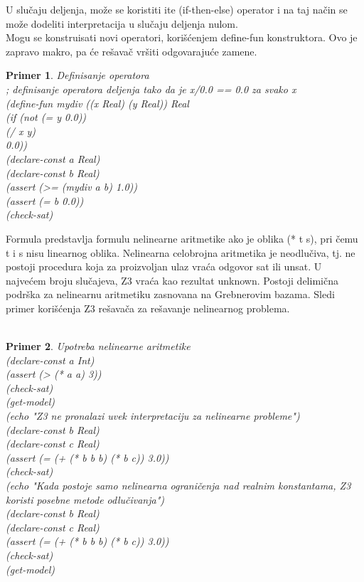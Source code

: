 \documentclass[12pt,oneside]{memoir}
\newtheorem{primer}{Primer}
\begin{document}
U slučaju deljenja, može se koristiti ite (if-then-else) operator i na taj način se može dodeliti interpretacija u slučaju deljenja nulom.
\\
Mogu se konstruisati novi operatori, korišćenjem define-fun konstruktora. Ovo je zapravo makro, pa će rešavač vršiti odgovarajuće zamene.
\begin{primer} Definisanje operatora
\\; definisanje operatora deljenja tako da je  x/0.0 == 0.0 za svako x
\\(define-fun mydiv ((x Real) (y Real)) Real
\\  (if (not (= y 0.0))
\\      (/ x y)
\\      0.0))
\\(declare-const a Real)
\\(declare-const b Real)
\\(assert (>= (mydiv a b) 1.0))
\\(assert (= b 0.0))
\\(check-sat)
\end{primer}
Formula predstavlja formulu nelinearne aritmetike ako je oblika (* t s), pri čemu t i s nisu linearnog oblika.
Nelinearna celobrojna aritmetika je neodlučiva, tj. ne postoji procedura koja za proizvoljan ulaz vraća odgovor sat ili unsat. U najvećem broju slučajeva, Z3 vraća kao rezultat unknown. 
Postoji delimična podrška za nelinearnu aritmetiku zasnovana na Grebnerovim bazama.
Sledi primer korišćenja Z3 rešavača za rešavanje nelinearnog problema.
\\ 
\\
\begin{primer} Upotreba nelinearne aritmetike
\\(declare-const a Int)
\\(assert (> (* a a) 3))
\\(check-sat)
\\(get-model)
\\(echo "Z3 ne pronalazi uvek interpretaciju za nelinearne probleme")
\\(declare-const b Real)
\\(declare-const c Real)
\\(assert (= (+ (* b b b) (* b c)) 3.0))
\\(check-sat)
\\(echo "Kada postoje samo nelinearna ograničenja nad realnim konstantama, Z3 koristi posebne metode odlučivanja")
\\(declare-const b Real)
\\(declare-const c Real)
\\(assert (= (+ (* b b b) (* b c)) 3.0))
\\(check-sat)
\\(get-model)
\end{primer}
\end{document}
